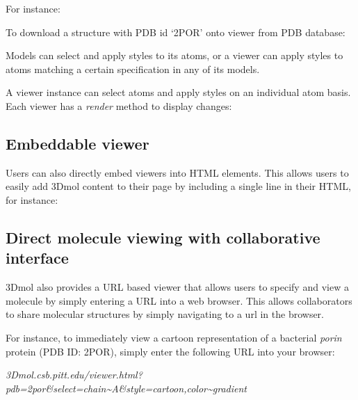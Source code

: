 \documentclass[]{bioinfo}
\begin{document}
For instance:

To download a structure with PDB id `2POR' onto viewer from PDB database:



Models can select and apply styles to its atoms, or a viewer can apply styles to atoms matching a certain specification in any of its models.

A viewer instance can select atoms and apply styles on an individual atom basis.  Each viewer has a \emph{render} method to display changes:



\subsection{Embeddable viewer}
Users can also directly embed viewers into HTML elements. This allows users to easily add 3Dmol content to their page by including a single line in their HTML, for instance:


\subsection{Direct molecule viewing with collaborative interface}
3Dmol also provides a URL based viewer that allows users to specify and view a molecule by simply entering a URL into a web browser.  This allows collaborators to share molecular structures by simply navigating to a url in the browser. 

For instance, to immediately view a cartoon representation of a bacterial \emph{porin} protein (PDB ID: 2POR), simply enter the following URL into your browser:

\emph{3Dmol.csb.pitt.edu/viewer.html?pdb=2por\&select=chain\~{}A\&style=cartoon,color\~{}gradient}
\end{document}
